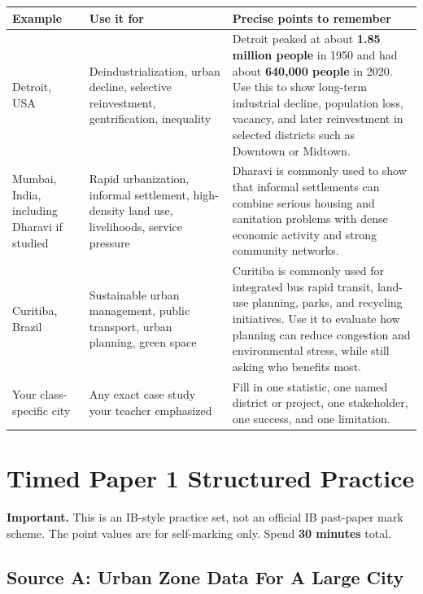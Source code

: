 \documentclass[11pt,a4paper]{article}
\newcommand{\term}[1]{\textcolor{HeadingBlue}{\textbf{#1}}}
\newcommand{\boxnote}[3]{%
\noindent\colorbox{#1}{%
  \begin{minipage}{0.965\textwidth}
  \sffamily
  \textbf{\textcolor{HeadingBlue}{#2}} #3
  \end{minipage}
}}
\begin{document}
\begin{tabularx}{\textwidth}{L{0.18\textwidth}Y Y}
\toprule
\textbf{Example} & \textbf{Use it for} & \textbf{Precise points to remember} \\
\midrule
Detroit, USA & Deindustrialization, urban decline, selective reinvestment,
gentrification, inequality & Detroit peaked at about \term{1.85 million people}
in 1950 and had about \term{640,000 people} in 2020. Use this to show long-term
industrial decline, population loss, vacancy, and later reinvestment in selected
districts such as Downtown or Midtown. \\
Mumbai, India, including Dharavi if studied & Rapid urbanization, informal
settlement, high-density land use, livelihoods, service pressure & Dharavi is
commonly used to show that informal settlements can combine serious housing and
sanitation problems with dense economic activity and strong community networks. \\
Curitiba, Brazil & Sustainable urban management, public transport, urban
planning, green space & Curitiba is commonly used for integrated bus rapid
transit, land-use planning, parks, and recycling initiatives. Use it to evaluate
how planning can reduce congestion and environmental stress, while still asking
who benefits most. \\
Your class-specific city & Any exact case study your teacher emphasized & Fill
in one statistic, one named district or project, one stakeholder, one success,
and one limitation. \\
\bottomrule
\end{tabularx}

\section{Timed Paper 1 Structured Practice}

\boxnote{SoftRed}{Important.}{This is an IB-style practice set, not an official
IB past-paper mark scheme. The point values are for self-marking only. Spend
\term{30 minutes} total.}

\subsection{Source A: Urban Zone Data For A Large City}
\end{document}
